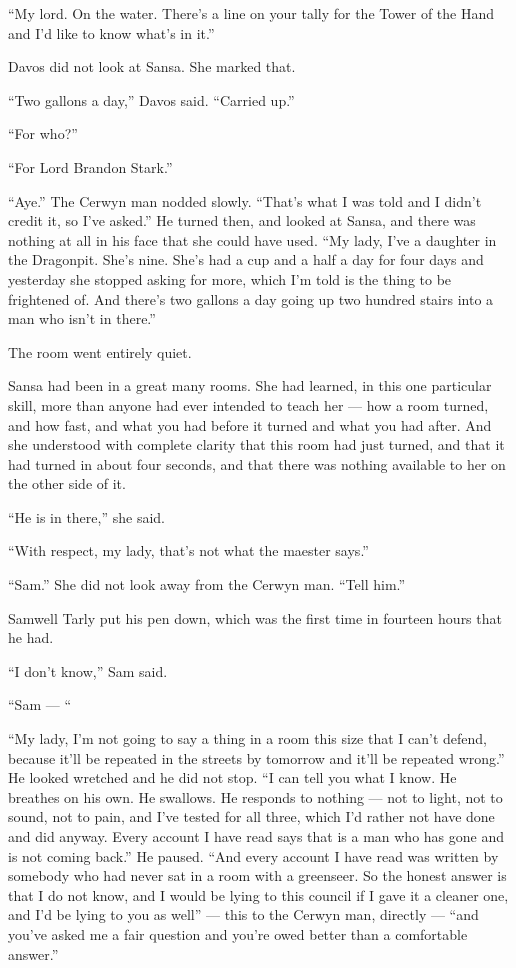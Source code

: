 “My lord. On the water. There’s a line on your tally for the Tower of the Hand and I’d like to know what’s in it.”

Davos did not look at Sansa. She marked that.

“Two gallons a day,” Davos said. “Carried up.”

“For who?”

“For Lord Brandon Stark.”

“Aye.” The Cerwyn man nodded slowly. “That’s what I was told and I didn’t credit it, so I’ve asked.” He turned then, and looked at Sansa, and there was nothing at all in his face that she could have used. “My lady, I’ve a daughter in the Dragonpit. She’s nine. She’s had a cup and a half a day for four days and yesterday she stopped asking for more, which I’m told is the thing to be frightened of. And there’s two gallons a day going up two hundred stairs into a man who isn’t in there.”

The room went entirely quiet.

Sansa had been in a great many rooms. She had learned, in this one particular skill, more than anyone had ever intended to teach her — how a room turned, and how fast, and what you had before it turned and what you had after. And she understood with complete clarity that this room had just turned, and that it had turned in about four seconds, and that there was nothing available to her on the other side of it.

“He is in there,” she said.

“With respect, my lady, that’s not what the maester says.”

“Sam.” She did not look away from the Cerwyn man. “Tell him.”

Samwell Tarly put his pen down, which was the first time in fourteen hours that he had.

“I don’t know,” Sam said.

“Sam — “

“My lady, I’m not going to say a thing in a room this size that I can’t defend, because it’ll be repeated in the streets by tomorrow and it’ll be repeated wrong.” He looked wretched and he did not stop. “I can tell you what I know. He breathes on his own. He swallows. He responds to nothing — not to light, not to sound, not to pain, and I’ve tested for all three, which I’d rather not have done and did anyway. Every account I have read says that is a man who has gone and is not coming back.” He paused. “And every account I have read was written by somebody who had never sat in a room with a greenseer. So the honest answer is that I do not know, and I would be lying to this council if I gave it a cleaner one, and I’d be lying to you as well” — this to the Cerwyn man, directly — “and you’ve asked me a fair question and you’re owed better than a comfortable answer.”

